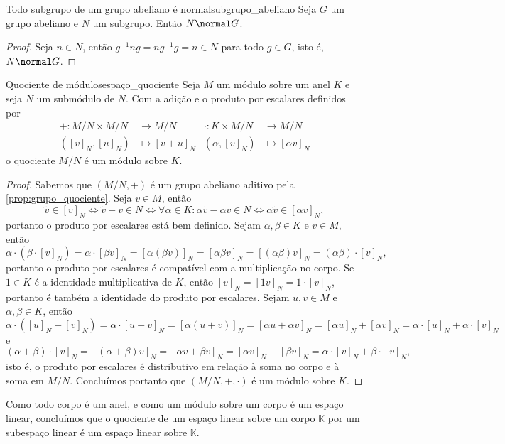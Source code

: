 \begin{proposition}{Todo subgrupo de um grupo abeliano é normal}{subgrupo_abeliano}
    Seja \(G\) um grupo abeliano e \(N\) um subgrupo. Então \(N \normal G\).
\end{proposition}
\begin{proof}
    Seja \(n \in N\), então \(g^{-1}ng = ng^{-1}g = n \in N\) para todo \(g \in G\), isto é, \(N \normal G\).
\end{proof}

\begin{proposition}{Quociente de módulos}{espaço_quociente}
    Seja \(M\) um módulo sobre um anel \(K\) e seja \(N\) um submódulo de \(N\). Com a adição e o produto por escalares definidos por
    \begin{align*}
        + : M/N \times M/N &\to M/N&
        \cdot : K \times M/N &\to M/N\\
        ([v]_N,[u]_N) &\mapsto [v + u]_N&
        (\alpha,[v]_N)&\mapsto [\alpha v]_N
    \end{align*}
    o quociente \(M/N\) é um módulo sobre \(K\).
\end{proposition}
\begin{proof}
     Sabemos que \((M/N, +)\) é um grupo abeliano aditivo pela \cref{prop:grupo_quociente}. Seja \(v \in M\), então
    \begin{equation*}
        \tilde{v} \in [v]_N \iff \tilde{v} - v \in N \iff \forall \alpha \in K: \alpha\tilde{v} - \alpha v \in N \iff \alpha \tilde{v} \in [\alpha v]_N,
    \end{equation*}
    portanto o produto por escalares está bem definido. Sejam \(\alpha, \beta \in K\) e \(v \in M\), então
    \begin{equation*}
        \alpha \cdot \left(\beta \cdot [v]_N\right) = \alpha \cdot [\beta v]_N = [\alpha (\beta v)]_N = [\alpha \beta v]_N = [(\alpha \beta) v]_N = (\alpha \beta)\cdot [v]_N,
    \end{equation*}
    portanto o produto por escalares é compatível com a multiplicação no corpo. Se \(1 \in K\) é a identidade multiplicativa de \(K\), então \([v]_N = [1v]_N = 1 \cdot [v]_N\), portanto é também a identidade do produto por escalares. Sejam \(u,v \in M\) e \(\alpha, \beta \in K\), então
    \begin{equation*}
        \alpha \cdot \left([u]_N + [v]_N\right) = \alpha \cdot [u + v]_N = [\alpha (u + v)]_N = [\alpha u + \alpha v]_N = [\alpha u]_N + [\alpha v]_N = \alpha\cdot [u]_N + \alpha \cdot [v]_N
    \end{equation*}
    e
    \begin{equation*}
        (\alpha + \beta)\cdot [v]_N = [(\alpha + \beta)v]_N = [\alpha v + \beta v]_N = [\alpha v]_N + [\beta v]_N = \alpha\cdot[v]_N + \beta\cdot[v]_N,
    \end{equation*}
    isto é, o produto por escalares é distributivo em relação à soma no corpo e à soma em \(M/N\). Concluímos portanto que \((M/N, +, \cdot)\) é um módulo sobre \(K\).
\end{proof}
\begin{remark}
    Como todo corpo é um anel, e como um módulo sobre um corpo é um espaço linear, concluímos que o quociente de um espaço linear sobre um corpo \(\mathbb{K}\) por um subespaço linear é um espaço linear sobre \(\mathbb{K}\).
\end{remark}
